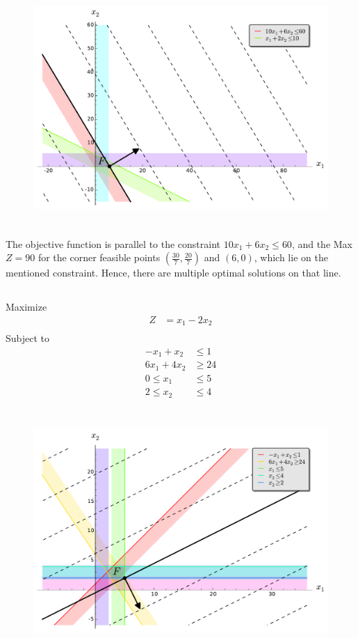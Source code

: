 \documentclass[12pt]{article}
\begin{document}
  \begin{figure}[H]
    \centering
\includegraphics[height=3.5in]{./images/p3_5.pdf}
\end{figure}

The objective function is parallel to the constraint $10x_1+6x_2\le 60$, and the Max $Z=90$ for the corner feasible points 
$\left(\frac{30}{7}, \frac{20}{7}\right)$ and $\left(6,0\right)$, which lie on the mentioned constraint. Hence, there are multiple optimal 
solutions on that line. 

\newpage
\subsection{}

Maximize 
\begin{align*}
Z           & = x_1 - 2 x_2 \\
\end{align*}
Subject to 
\begin{align*}
-x_1+x_2    & \le 1         \\
6 x_1+4 x_2 & \ge 24        \\
0 \le x_1   & \le 5         \\
2 \le x_2   & \le 4         \\
\end{align*}

  \begin{figure}[H]
    \centering
\includegraphics[height=3.5in]{./images/p3_6.pdf}
\end{figure}
\end{document}
